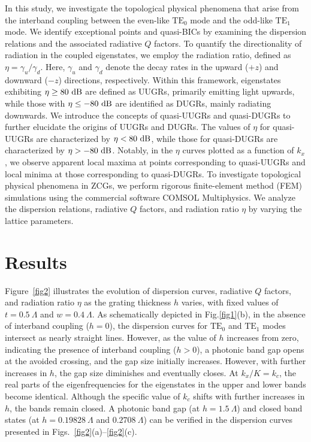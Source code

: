 \documentclass[%
 reprint,
superscriptaddress,
 amsmath,amssymb, aps,
]{revtex4-1}
\begin{document}
In this study, we investigate the topological physical phenomena that arise from the interband coupling between the even-like $\mathrm{TE}_{0}$ mode and the odd-like $\mathrm{TE}_{1}$ mode. We identify exceptional points and quasi-BICs by examining the dispersion relations and the associated radiative $Q$ factors. To quantify the directionality of radiation in the coupled eigenstates, we employ the radiation ratio, defined as $\eta = \gamma_u / \gamma_d$. Here, $\gamma_u$ and $\gamma_d$ denote the decay rates in the upward ($+z$) and downward ($-z$) directions, respectively. Within this framework, eigenstates exhibiting $\eta \geq 80~\rm{dB}$ are defined as UUGRs, primarily emitting light upwards, while those with $\eta \leq -80~\rm{dB}$ are identified as DUGRs, mainly radiating downwards. We introduce the concepts of quasi-UUGRs and quasi-DUGRs to further elucidate the origins of UUGRs and DUGRs. The values of $\eta$ for quasi-UUGRs are characterized by $\eta < 80~\rm{dB}$, while those for quasi-DUGRs are characterized by $\eta > -80~\rm{dB}$. Notably, in the $\eta$ curves plotted as a function of $k_x$, we observe apparent local maxima at points corresponding to quasi-UUGRs and local minima at those corresponding to quasi-DUGRs. To investigate topological physical phenomena in ZCGs, we perform rigorous finite-element method (FEM) simulations using the commercial software COMSOL Multiphysics. We analyze the dispersion relations, radiative $Q$ factors, and radiation ratio $\eta$ by varying the lattice parameters.

\section{Results}
Figure~\ref{fig2} illustrates the evolution of dispersion curves, radiative $Q$ factors, and radiation ratio $\eta$ as the grating thickness $h$ varies, with fixed values of $t=0.5~\Lambda$ and $w=0.4~\Lambda$. As schematically depicted in Fig.\ref{fig1}(b), in the absence of interband coupling ($h=0$), the dispersion curves for $\mathrm{TE}_{0}$ and $\mathrm{TE}_{1}$ modes intersect as nearly straight lines. However, as the value of $h$ increases from zero, indicating the presence of interband coupling ($h>0$), a photonic band gap opens at the avoided crossing, and the gap size initially increases. However, with further increases in $h$, the gap size diminishes and eventually closes. At $k_x/K=k_c$, the real parts of the eigenfrequencies for the eigenstates in the upper and lower bands become identical. Although the specific value of $k_c$ shifts with further increases in $h$, the bands remain closed. A photonic band gap (at $h=1.5~\Lambda$) and closed band states (at $h=0.19828~\Lambda$ and $0.2708~\Lambda$) can be verified in the dispersion curves presented in Figs.~\ref{fig2}(a)--\ref{fig2}(c).
\end{document}
